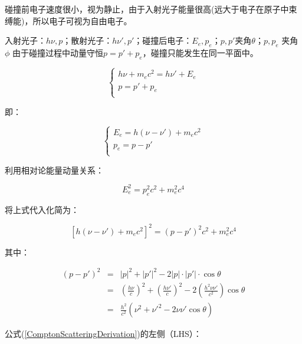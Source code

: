 碰撞前电子速度很小，视为静止，由于入射光子能量很高(远大于电子在原子中束缚能)，所以电子可视为自由电子。


入射光子：$h\nu ,p$；散射光子：$h\nu ',p'$；碰撞后电子：$E_e ,p_e $；$p,p'$夹角$\theta$；$p,p_e $
夹角$\phi$
由于碰撞过程中动量守恒$p = p' + p_e $，碰撞只能发生在同一平面中。

\begin{equation}
\left\{ \begin{array}{l}
 h\nu  + m_e c^2  = h\nu ' + E_e  \\
 p = p' + p_e  \\
 \end{array} \right.
\end{equation}

即：

\begin{equation}
\left\{ \begin{array}{l}
 E_e  = h(\nu  - \nu ') + m_e c^2  \\
 p_e  = p - p' \\
 \end{array} \right.
 \end{equation}


利用相对论能量动量关系：

\begin{equation}
E_e ^2  = p_e ^2 c^2  + m_e ^2 c^4 
\end{equation}

将上式代入化简为：

\begin{equation}
\left[ {h(\nu  - \nu ') + m_e c^2 } \right]^2  = (p - p')^2 c^2  + m_e ^2 c^4 
\label{ComptonScatteringDerivation}
\end{equation}

其中：

\begin{eqnarray*}
(p - p')^2 &=&  \left| p \right|^2  + \left| {p'} \right|^2  -
2\left| p \right| \cdot \left| {p'} \right| \cdot \cos \theta \\
 {} & = & \left( {\frac{{h\nu }}{c}} \right)^2  + \left( {\frac{{h\nu '}}{c}}
\right)^2  - 2\left( {\frac{{h^2 \nu \nu '}}{{c^2 }}} \right)\cos
\theta \\
{} & = & \frac{{h^2 }}{{c^2 }}\left( {\nu ^2  + \nu '^2  - 2\nu \nu
'\cos \theta } \right)
\end{eqnarray*}

公式(\ref{ComptonScatteringDerivation})的左侧（LHS）：

